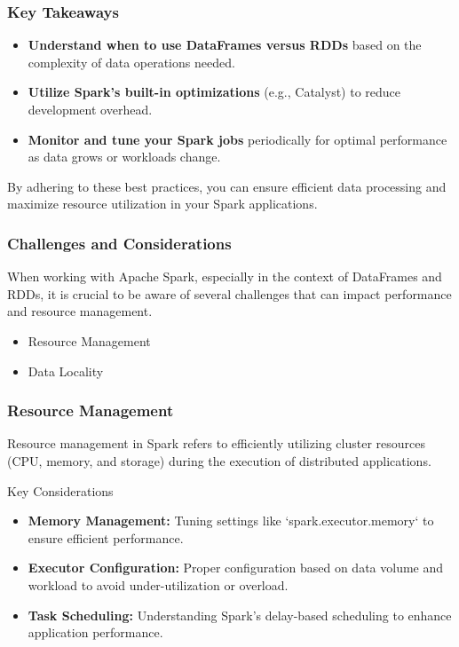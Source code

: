\documentclass[aspectratio=169]{beamer}
\begin{document}
\begin{frame}[fragile]
    \frametitle{Key Takeaways}
    \begin{itemize}
        \item \textbf{Understand when to use DataFrames versus RDDs} based on the complexity of data operations needed.
        \item \textbf{Utilize Spark's built-in optimizations} (e.g., Catalyst) to reduce development overhead.
        \item \textbf{Monitor and tune your Spark jobs} periodically for optimal performance as data grows or workloads change.
    \end{itemize}
    By adhering to these best practices, you can ensure efficient data processing and maximize resource utilization in your Spark applications.
\end{frame}

\begin{frame}[fragile]
  \frametitle{Challenges and Considerations}
  When working with Apache Spark, especially in the context of DataFrames and RDDs, it is crucial to be aware of several challenges that can impact performance and resource management.
  \begin{itemize}
    \item Resource Management
    \item Data Locality
  \end{itemize}
\end{frame}

\begin{frame}[fragile]
  \frametitle{Resource Management}
  Resource management in Spark refers to efficiently utilizing cluster resources (CPU, memory, and storage) during the execution of distributed applications.
  
  \begin{block}{Key Considerations}
    \begin{itemize}
      \item \textbf{Memory Management:} Tuning settings like `spark.executor.memory` to ensure efficient performance.
      \item \textbf{Executor Configuration:} Proper configuration based on data volume and workload to avoid under-utilization or overload.
      \item \textbf{Task Scheduling:} Understanding Spark's delay-based scheduling to enhance application performance.
    \end{itemize}
  \end{block}
\end{frame}
\end{document}
